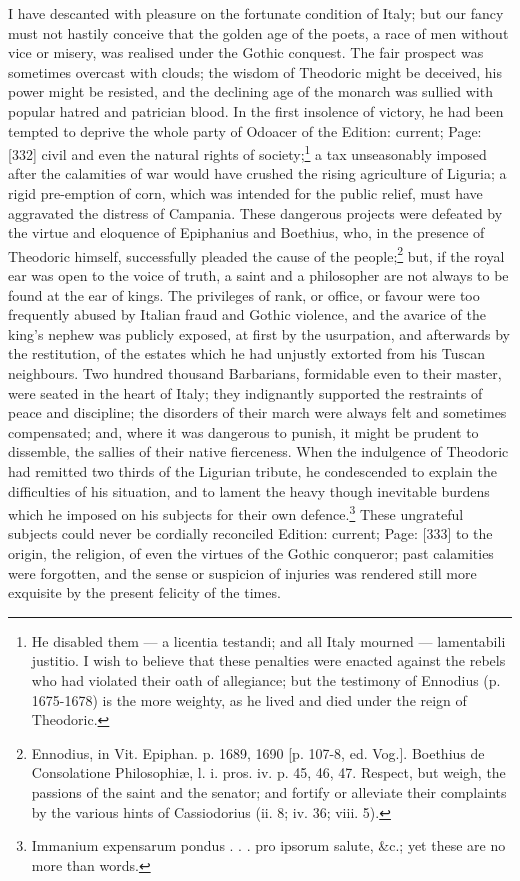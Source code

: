 I have descanted with pleasure on the fortunate condition of Italy; but our fancy must not hastily conceive that the golden age of the poets, a race of men without vice or misery, was realised under the Gothic conquest. The fair prospect was sometimes overcast with clouds; the wisdom of Theodoric might be deceived, his power might be resisted, and the declining age of the monarch was sullied with popular hatred and patrician blood. In the first insolence of victory, he had been tempted to deprive the whole party of Odoacer of the Edition: current; Page: [332] civil and even the natural rights of society;\footnote{He disabled them \texthebrew{—} a licentia testandi; and all Italy mourned \texthebrew{—} lamentabili justitio. I wish to believe that these penalties were enacted against the rebels who had violated their oath of allegiance; but the testimony of Ennodius (p. 1675-1678) is the more weighty, as he lived and died under the reign of Theodoric.} a tax unseasonably imposed after the calamities of war would have crushed the rising agriculture of Liguria; a rigid pre-emption of corn, which was intended for the public relief, must have aggravated the distress of Campania. These dangerous projects were defeated by the virtue and eloquence of Epiphanius and Boethius, who, in the presence of Theodoric himself, successfully pleaded the cause of the people;\footnote{Ennodius, in Vit. Epiphan. p. 1689, 1690 [p. 107-8, ed. Vog.]. Boethius de Consolatione Philosophiæ, l. i. pros. iv. p. 45, 46, 47. Respect, but weigh, the passions of the saint and the senator; and fortify or alleviate their complaints by the various hints of Cassiodorius (ii. 8; iv. 36; viii. 5).} but, if the royal ear was open to the voice of truth, a saint and a philosopher are not always to be found at the ear of kings. The privileges of rank, or office, or favour were too frequently abused by Italian fraud and Gothic violence, and the avarice of the king\texthebrew{}’s nephew was publicly exposed, at first by the usurpation, and afterwards by the restitution, of the estates which he had unjustly extorted from his Tuscan neighbours. Two hundred thousand Barbarians, formidable even to their master, were seated in the heart of Italy; they indignantly supported the restraints of peace and discipline; the disorders of their march were always felt and sometimes compensated; and, where it was dangerous to punish, it might be prudent to dissemble, the sallies of their native fierceness. When the indulgence of Theodoric had remitted two thirds of the Ligurian tribute, he condescended to explain the difficulties of his situation, and to lament the heavy though inevitable burdens which he imposed on his subjects for their own defence.\footnote{Immanium expensarum pondus . . . pro ipsorum salute, \&c.; yet these are no more than words.} These ungrateful subjects could never be cordially reconciled Edition: current; Page: [333] to the origin, the religion, of even the virtues of the Gothic conqueror; past calamities were forgotten, and the sense or suspicion of injuries was rendered still more exquisite by the present felicity of the times.

